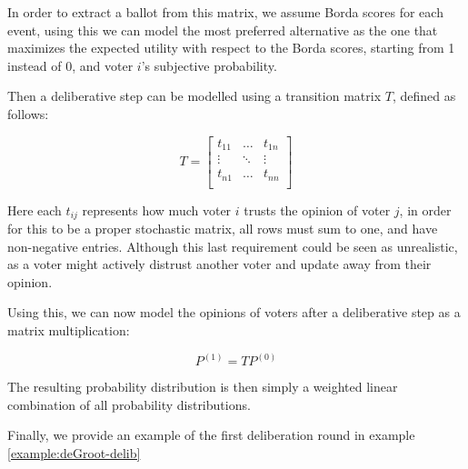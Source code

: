 In order to extract a ballot from this matrix, we assume Borda scores for each event, using this we can model the most preferred alternative as the one that maximizes the expected utility with respect to the Borda scores, starting from 1 instead of 0, and voter $i$'s subjective probability.

Then a deliberative step can be modelled using a transition matrix $T$, defined as follows:

\[
    T=\begin{bmatrix}
        t_{11} & \dots  & t_{1n} \\
        \vdots & \ddots & \vdots \\
        t_{n1} & \dots  & t_{nn} \\
    \end{bmatrix}
\]

Here each $t_{ij}$ represents how much voter $i$ trusts the opinion of voter $j$, in order for this to be a proper stochastic matrix, all rows must sum to one, and have non-negative entries. Although this last requirement could be seen as unrealistic, as a voter might actively distrust another voter and update away from their opinion.

Using this, we can now model the opinions of voters after a deliberative step as a matrix multiplication:

\begin{equation}
    P^{(1)} = TP^{(0)}
    \label{eq:update_degroot}
\end{equation}

The resulting probability distribution is then simply a weighted linear combination of all probability distributions.

Finally, we provide an example of the first deliberation round in example \ref{example:deGroot-delib}

